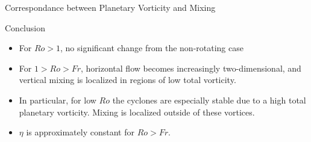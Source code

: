\documentclass[aspecttatio=169]{beamer}
\begin{document}
\begin{frame}{Correspondance between Planetary Vorticity and Mixing}
    \emp

\end{frame}


\begin{frame}{Conclusion}

    \begin{itemize}
    \item For $Ro > 1$, no significant change from the non-rotating case
    \item For $1 > Ro > Fr$, horizontal flow becomes increasingly
    two-dimensional, and vertical mixing is localized in regions of low total
    vorticity. 
    \item In particular, for low $Ro$ the cyclones are especially stable due to
    a high total planetary vorticity. Mixing is localized outside of these
    vortices. 
    \item $\eta$ is approximately constant for $Ro > Fr$. 
    \end{itemize}

\end{frame}

{\scriptsize


}
\end{document}
